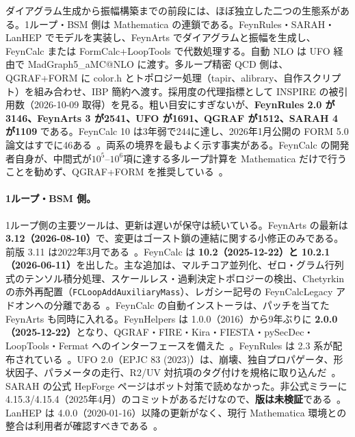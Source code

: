 \documentclass[a4paper,10pt]{ltjsarticle}
\begin{document}
ダイアグラム生成から振幅構築までの前段には、ほぼ独立した二つの生態系がある。1ループ・BSM 側は Mathematica の連鎖である。FeynRules・SARAH・LanHEP でモデルを実装し、FeynArts でダイアグラムと振幅を生成し、FeynCalc または FormCalc+LoopTools で代数処理する。自動 NLO は UFO 経由で MadGraph5\_aMC@NLO に渡す。多ループ精密 QCD 側は、QGRAF+FORM に color.h とトポロジー処理（tapir、alibrary、自作スクリプト）を組み合わせ、IBP 簡約へ渡す。採用度の代理指標として INSPIRE の被引用数（2026-10-09 取得）を見る。粗い目安にすぎないが、\textbf{FeynRules 2.0 が3146、FeynArts 3 が2541、UFO が1691、QGRAF が1512、SARAH 4 が1109} である。FeynCalc 10 は3年弱で244に達し、2026年1月公開の FORM 5.0 論文はすでに46ある~\cite{r1,r2,r3,r4,r5}。両系の境界を最もよく示す事実がある。FeynCalc の開発者自身が、中間式が$10^5$--$10^6$項に達する多ループ計算を Mathematica だけで行うことを勧めず、QGRAF+FORM を推奨している~\cite{r6}。

\paragraph{1ループ・BSM 側。}1ループ側の主要ツールは、更新は遅いが保守は続いている。FeynArts の最新は \textbf{3.12（2026-08-10）}で、変更はゴースト鎖の連結に関する小修正のみである。前版 3.11 は2022年3月である~\cite{r7}。FeynCalc は \textbf{10.2（2025-12-22）と 10.2.1（2026-06-11）}を出した。主な追加は、マルチコア並列化、ゼロ・グラム行列式のテンソル積分処理、スケールレス・過剰決定トポロジーの検出、Chetyrkin の赤外再配置（\texttt{FCLoopAddAuxiliaryMass}）、レガシー記号の FeynCalcLegacy アドオンへの分離である~\cite{r8,r9}。FeynCalc の自動インストーラは、パッチを当てた FeynArts も同時に入れる。FeynHelpers は 1.0.0（2016）から9年ぶりに \textbf{2.0.0（2025-12-22）}となり、QGRAF・FIRE・Kira・FIESTA・pySecDec・LoopTools・Fermat へのインターフェースを備えた~\cite{r10,r11}。FeynRules は 2.3 系が配布されている~\cite{r12}。UFO 2.0（EPJC 83 (2023)）は、崩壊、独自プロパゲータ、形状因子、パラメータの走行、R2/UV 対抗項のタグ付けを規格に取り込んだ~\cite{r13}。SARAH の公式 HepForge ページはボット対策で読めなかった。非公式ミラーに 4.15.3/4.15.4（2025年4月）のコミットがあるだけなので、\textbf{版は未検証}である~\cite{r14}。LanHEP は 4.0.0（2020-01-16）以降の更新がなく、現行 Mathematica 環境との整合は利用者が確認すべきである~\cite{r15}。
\end{document}
